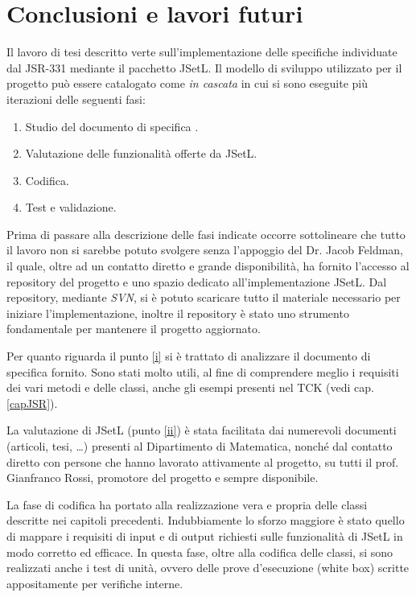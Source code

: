 
\chapter{Conclusioni e lavori futuri}\label{conclusioni}

Il lavoro di tesi descritto verte sull'implementazione delle
specifiche individuate dal JSR-331 mediante il pacchetto JSetL.
Il modello di sviluppo utilizzato per il progetto può essere catalogato come
\emph{in cascata} in cui si sono eseguite più iterazioni delle seguenti fasi:
\begin{enumerate}[i]
\item \label{i}Studio del documento di specifica \cite{specifiche}.
\item \label{ii}Valutazione delle funzionalità offerte da JSetL.
\item \label{iii}Codifica.
\item \label{iv}Test e validazione.
\end{enumerate}
Prima di passare alla descrizione delle fasi indicate occorre sottolineare
che tutto il lavoro non si sarebbe potuto svolgere senza l'appoggio del
Dr. Jacob Feldman, il quale, oltre ad un contatto diretto e grande 
disponibilità, ha fornito l'accesso al repository del  progetto e uno spazio
dedicato all'implementazione JSetL. Dal repository, mediante \emph{SVN}, si
è potuto scaricare tutto il materiale necessario per iniziare l'implementazione,
inoltre il repository
è stato uno strumento fondamentale per mantenere il progetto aggiornato.

Per quanto riguarda il punto \ref{i} si è trattato di analizzare il documento di
specifica fornito. Sono stati molto utili, al fine di comprendere meglio i 
requisiti dei vari metodi e delle classi, anche gli esempi presenti nel TCK
(vedi cap. \ref{capJSR}).

La valutazione di JSetL (punto \ref{ii}) è stata facilitata dai numerevoli 
documenti
(articoli, tesi, \ldots) presenti al Dipartimento di Matematica, nonché dal
contatto diretto con persone che hanno lavorato attivamente al 
progetto, su tutti il prof. Gianfranco Rossi, promotore del progetto e 
sempre disponibile.

La fase di codifica ha portato alla realizzazione vera e propria delle classi
descritte nei capitoli precedenti. Indubbiamente lo sforzo maggiore è
stato quello di mappare i requisiti di input e di output richiesti sulle 
funzionalità di JSetL in modo corretto ed efficace. In questa fase, oltre
alla codifica delle classi, si sono realizzati anche i test di unità, ovvero
delle prove d'esecuzione (white box) scritte appositamente per verifiche 
interne.

